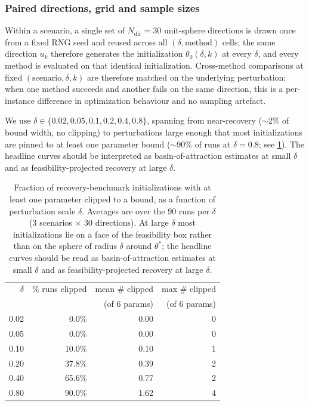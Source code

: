 \subsubsection{Paired directions, grid and sample sizes}\label{sec:method:opt:recovery-benchmark:grid}
Within a scenario, a single set of $N_{\text{dir}} = 30$ unit-sphere directions is drawn once from a fixed RNG seed and reused across all $(\delta, \text{method})$ cells;
the same direction $u_k$ therefore generates the initialization $\theta_0(\delta, k)$ at every $\delta$, and every method is evaluated on that identical initialization.
Cross-method comparisons at fixed $(\text{scenario}, \delta, k)$ are therefore matched on the underlying perturbation:
when one method succeeds and another fails on the same direction, this is a per-instance difference in optimization behaviour and no sampling artefact.

We use $\delta \in \{0.02, 0.05, 0.1, 0.2, 0.4, 0.8\}$, spanning from near-recovery ($\sim$2\% of bound width, no clipping)
to perturbations large enough that most initializations are pinned to at least one parameter bound ($\sim$90\% of runs at $\delta = 0.8$; see \cref{tab:clipping}).
The headline curves should be interpreted as basin-of-attraction estimates at small $\delta$ and as feasibility-projected recovery at large $\delta$.

\begin{table}[t]
  \centering
  \caption{Fraction of recovery-benchmark initializations with at
  least one parameter clipped to a bound, as a function of
  perturbation scale $\delta$. Averages are over the 90 runs per
  $\delta$ (3 scenarios $\times$ 30 directions). At large $\delta$
  most initializations lie on a face of the feasibility box rather
  than on the sphere of radius $\delta$ around $\theta^{*}$; the
  headline curves should be read as basin-of-attraction estimates
  at small $\delta$ and as feasibility-projected recovery at large
  $\delta$.}
  \label{tab:clipping}
  \begin{tabular}{rrrr}
  \toprule
  $\delta$ & \% runs clipped & mean \# clipped & max \# clipped \\
           &                 & (of 6 params)   & (of 6 params)  \\
  \midrule
  0.02 &  0.0\% & 0.00 & 0 \\
  0.05 &  0.0\% & 0.00 & 0 \\
  0.10 & 10.0\% & 0.10 & 1 \\
  0.20 & 37.8\% & 0.39 & 2 \\
  0.40 & 65.6\% & 0.77 & 2 \\
  0.80 & 90.0\% & 1.62 & 4 \\
  \bottomrule
  \end{tabular}
\end{table}

